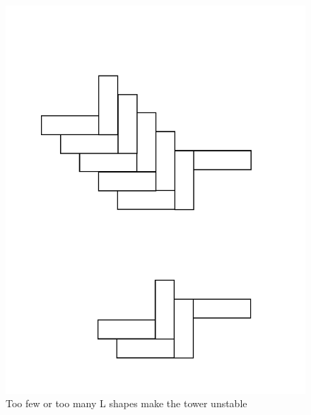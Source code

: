 \documentclass[12pt]{article}
\begin{document}
\begin{figure}[h]

\centering
\includegraphics[scale=0.4, angle=-90]{Diagram1}
\caption{Too few or too many L shapes make the tower unstable \label{fig:towers}}
\end{figure}
\end{document}
